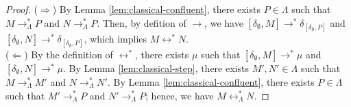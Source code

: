 \ConservTheorem*
\begin{proof}[Proof]
  ($\Rightarrow$)
  By Lemma \ref{lem:classical-confluent}, there exists $P \in \Lambda$ such that $M \longrightarrow^*_\Lambda P$ and $N \longrightarrow^*_\Lambda P$.
  Then, by defition of $\longrightarrow$, we have $[\delta_\emptyset, M] \longrightarrow^* \delta_{[\delta_\emptyset, P]}$ and $[\delta_\emptyset, N] \longrightarrow^* \delta_{[\delta_\emptyset, P]}$, which implies $M \longleftrightarrow^* N$.
  \\
  ($\Leftarrow$)
  By the definition of $\longleftrightarrow^*$, there exists $\mu$ such that $[\delta_\emptyset, M] \longrightarrow^* \mu$ and $[\delta_\emptyset, N] \longrightarrow^* \mu$.
  By Lemma \ref{lem:classical-step}, there exists $M', N' \in \Lambda$ such that $M \longrightarrow^*_\Lambda M'$ and $N \longrightarrow^*_\Lambda N'$.
  By Lemma \ref{lem:classical-confluent}, there exists $P \in \Lambda$ such that $M' \longrightarrow^*_\Lambda P$ and $N' \longrightarrow^*_\Lambda P$; hence, we have $M \longleftrightarrow^*_\Lambda N$.
\end{proof}